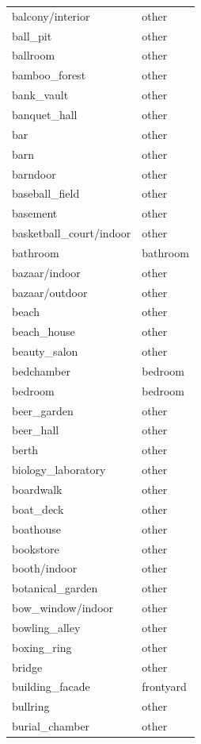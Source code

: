 \begin{table}[h!]
\begin{tabular}{| l | l |}
		balcony/interior &        other \\
		ball\_pit &        other \\
		ballroom &        other \\
		bamboo\_forest &        other \\
		bank\_vault &        other \\
		banquet\_hall &        other \\
		bar &        other \\
		barn &        other \\
		barndoor &        other \\
		baseball\_field &        other \\
		basement &        other \\
		basketball\_court/indoor &        other \\
		bathroom &     bathroom \\
		bazaar/indoor &        other \\
		bazaar/outdoor &        other \\
		beach &        other \\
		beach\_house &        other \\
		beauty\_salon &        other \\
		bedchamber &      bedroom \\
		bedroom &      bedroom \\
		beer\_garden &        other \\
		beer\_hall &        other \\
		berth &        other \\
		biology\_laboratory &        other \\
		boardwalk &        other \\
		boat\_deck &        other \\
		boathouse &        other \\
		bookstore &        other \\
		booth/indoor &        other \\
		botanical\_garden &        other \\
		bow\_window/indoor &        other \\
		bowling\_alley &        other \\
		boxing\_ring &        other \\
		bridge &        other \\
		building\_facade &    frontyard \\
		bullring &        other \\
		burial\_chamber &        other \\

\end{tabular}
\end{table}

